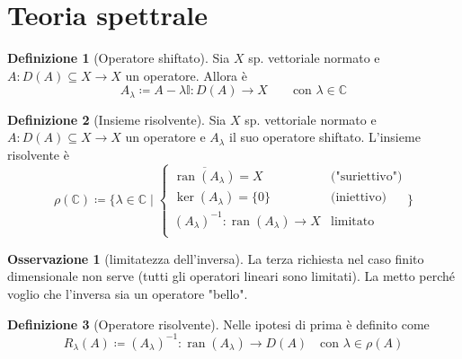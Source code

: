 \documentclass[a4paper,10pt]{article}
\theoremstyle{definition}
\DeclareMathOperator*{\ran}{ran}
\newcommand{\im}{\mathbb{C}} %
\newcommand{\id}{\mathbb{I}} %
\theoremstyle{indentdefinition}
\newtheorem{defn}{Definizione}[section]
\theoremstyle{indenttheorem}
\theoremstyle{myremark}
\newtheorem*{rem*}{Osservazione}
\theoremstyle{indentgeneral}
\begin{document}
\pagebreak
\section{Teoria spettrale}
\begin{defn}[Operatore shiftato]Sia $X$ sp. vettoriale normato e $A:D(A)\subseteq X\to X$ un operatore. Allora è $$A_\lambda\coloneqq A-\lambda \id:D(A)\to X\qquad \text{con } \lambda\in\im$$ 
    
\end{defn}
\begin{defn}[Insieme risolvente]
Sia $X$ sp. vettoriale normato e $A:D(A)\subseteq X\to X$ un operatore e $A_\lambda$ il suo operatore shiftato. L'insieme risolvente è
$$\rho(\im)\coloneqq\{\lambda\in\im\mid\begin{cases}
    \overline{\ran(A_\lambda)}=X & \text{("suriettivo")}\\
    \ker(A_\lambda)=\{0\} & \text{(iniettivo)}\\
    (A_\lambda)^{-1}:\ran(A_\lambda)\to X & \text{limitato}\\
\end{cases}\}$$
\end{defn}

\begin{rem*}[limitatezza dell'inversa]
    La terza richiesta nel caso finito dimensionale non serve (tutti gli operatori lineari sono limitati). La metto perché voglio che l'inversa sia un operatore "bello".
    \end{rem*}

\begin{defn}[Operatore risolvente]
    Nelle ipotesi di prima è definito come
    $$R_\lambda(A)\coloneqq (A_\lambda)^{-1}:\ran(A_\lambda)\to D(A)\quad \text{con }\lambda\in\rho(A)$$
\end{defn}
\end{document}
